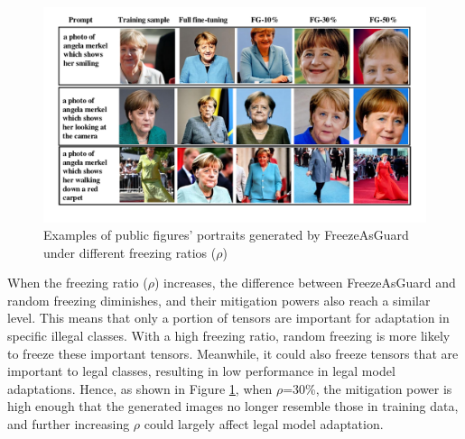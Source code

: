 \documentclass{article}
\begin{document}
\begin{figure}
	\centering
	\vspace{-0.05in}
	\includegraphics[width=0.85\linewidth]{figures/ff25_ratios_3row.pdf}
	\caption{Examples of public figures' portraits generated by FreezeAsGuard under different freezing ratios ($\rho$)}
	\label{fig:ff25_ratio}
	\vspace{-0.25in}
\end{figure}

When the freezing ratio ($\rho$) increases, the difference between FreezeAsGuard and random freezing diminishes, and their mitigation powers also reach a similar level. This means that only a portion of tensors are important for adaptation in specific illegal classes. With a high freezing ratio, random freezing is more likely to freeze these important tensors. Meanwhile, it could also freeze tensors that are important to legal classes, resulting in low performance in legal model adaptations. Hence, as shown in Figure \ref{fig:ff25_ratio}, when $\rho$=30\%, the mitigation power is high enough that the generated images no longer resemble those in training data, and further increasing $\rho$ could largely affect legal model adaptation.
\end{document}
